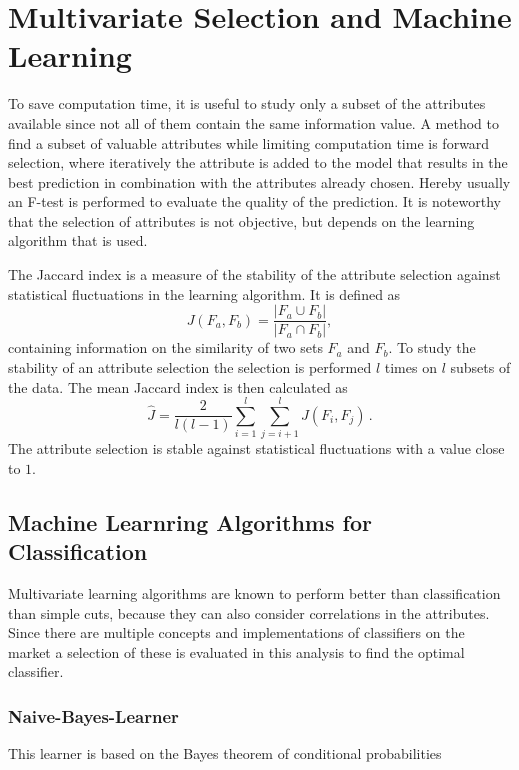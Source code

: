 \section{Multivariate Selection and Machine Learning}
To save computation time, it is useful to study only a subset of the attributes available since not all of them contain the same information value. A method to find a subset of valuable attributes while limiting computation time is forward selection, where iteratively the attribute is added to the model that results in the best prediction in combination with the attributes already chosen. Hereby usually an F-test is performed to evaluate the quality of the prediction. It is noteworthy that the selection of attributes is not objective, but depends on the learning algorithm that is used.

The Jaccard index is a measure of the stability of the attribute selection against statistical fluctuations in the learning algorithm. It is defined as
\begin{equation*}
    J \left(F_a, F_b \right) = \frac{|F_a \cup F_b|}{|F_a \cap F_b|},
\end{equation*}
containing information on the similarity of two sets $F_a$ and $F_b$.
To study the stability of an attribute selection the selection is performed $l$ times on $l$ subsets of the data. The mean Jaccard index is then calculated as
\begin{equation*}
    \hat{J} = \frac{2}{l \left(l - 1 \right)} \sum\limits_{i = 1}^{l}\sum\limits_{j = i+1}^{l} J\left(F_i, F_j \right) \, .
\end{equation*}
The attribute selection is stable against statistical fluctuations with a value close to $1$.\\

\subsection{Machine Learnring Algorithms for Classification}
Multivariate learning algorithms are known to perform better than classification than simple cuts, because they can also consider correlations in the attributes. Since there are multiple concepts and implementations of classifiers on the market a selection of these is evaluated in this analysis to find the optimal classifier.

\subsubsection*{Naive-Bayes-Learner}
This learner is based on the Bayes theorem of conditional probabilities


